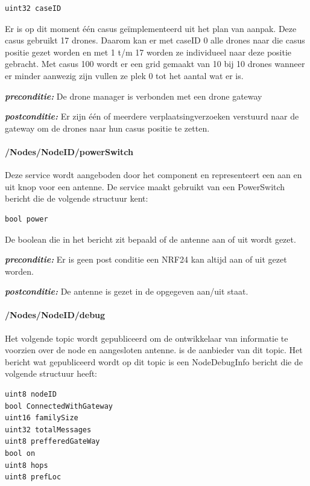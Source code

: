 \documentclass[a4paper, 11pt, oneside]{report}
\begin{document}
\begin{lstlisting}
uint32 caseID
\end{lstlisting}

Er is op dit moment één casus geïmplementeerd uit het plan van aanpak.
Deze casus gebruikt 17 drones. 
Daarom kan er met caseID 0 alle drones naar die casus positie gezet worden en met 1 t/m 17 worden ze individueel naar deze positie gebracht.
Met casus 100 wordt er een grid gemaakt van 10 bij 10 drones wanneer er minder aanwezig zijn vullen ze plek 0 tot het aantal wat er is.   

\textbf{\textit{preconditie:}}  De drone manager is verbonden met een drone gateway 

\textbf{\textit{postconditie:}} Er zijn één of meerdere verplaatsingverzoeken verstuurd naar de gateway om de drones naar hun casus positie te zetten.

\paragraph{/Nodes/NodeID/powerSwitch}
\label{DetailedDesign:ros:extern:rosinterfaces:service:powerswitch}
Deze service wordt aangeboden door het component  en representeert een aan en uit knop voor een antenne.
De service maakt gebruikt van een PowerSwitch bericht die de volgende structuur kent:

\begin{lstlisting}
bool power
\end{lstlisting}

De boolean die in het bericht zit bepaald of de antenne aan of uit wordt gezet.

\textbf{\textit{preconditie:}}  Er is geen post conditie een NRF24 kan altijd aan of uit gezet worden.

\textbf{\textit{postconditie:}} De antenne is gezet in de opgegeven aan/uit staat.

\paragraph{/Nodes/NodeID/debug}
\label{DetailedDesign:ros:extern:rosinterfaces:topic:debug}

Het volgende topic wordt gepubliceerd om de ontwikkelaar van informatie te voorzien over de node en aangesloten antenne.
 is de aanbieder van dit topic.
Het bericht wat gepubliceerd wordt op dit topic is een NodeDebugInfo bericht die de volgende structuur heeft:
\begin{lstlisting}
uint8 nodeID
bool ConnectedWithGateway 
uint16 familySize
uint32 totalMessages
uint8 prefferedGateWay
bool on
uint8 hops
uint8 prefLoc
\end{lstlisting}
\end{document}
